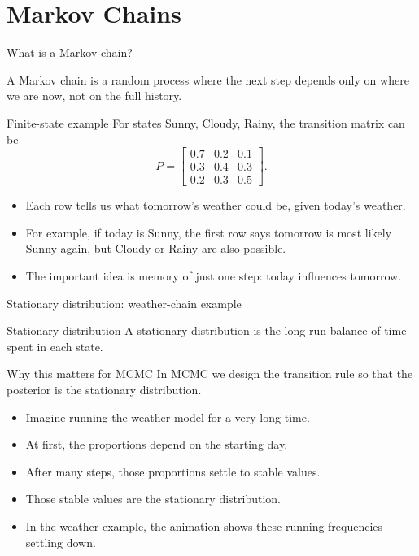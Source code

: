 \documentclass[aspectratio=169]{beamer}
\begin{document}
\section{Markov Chains}

\begin{frame}{What is a Markov chain?}
\small

A Markov chain is a random process where the next step depends only on \alert{where we are now}, not on the full history.

\begin{block}{Finite-state example}
For states Sunny, Cloudy, Rainy, the transition matrix can be
\[
P=
\begin{bmatrix}
0.7 & 0.2 & 0.1\\
0.3 & 0.4 & 0.3\\
0.2 & 0.3 & 0.5
\end{bmatrix}.
\]
\end{block}

\begin{itemize}
    \item[--] Each row tells us what tomorrow's weather could be, given today's weather.
    \item[--] For example, if today is Sunny, the first row says tomorrow is most likely Sunny again, but Cloudy or Rainy are also possible.
    \item[--] The important idea is memory of just one step: today influences tomorrow.
\end{itemize}
\end{frame}

\begin{frame}{Stationary distribution: weather-chain example}
\small

\begin{block}{Stationary distribution}
A stationary distribution is the long-run balance of time spent in each state.
\end{block}

\begin{alertblock}{Why this matters for MCMC}
In MCMC we design the transition rule so that the posterior is the stationary distribution.
\end{alertblock}

\begin{itemize}
    \item[--] Imagine running the weather model for a very long time.
    \item[--] At first, the proportions depend on the starting day.
    \item[--] After many steps, those proportions settle to stable values.
    \item[--] Those stable values are the stationary distribution.
    \item[--] In the weather example, the animation shows these running frequencies settling down.
\end{itemize}
\end{frame}
\end{document}
